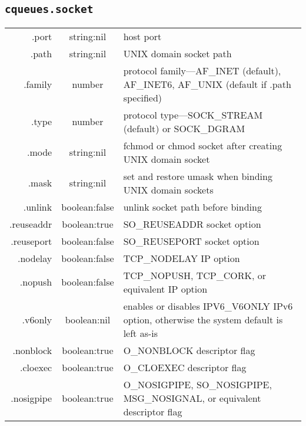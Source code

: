 \documentclass[11pt, oneside]{memoir}
\newcounter{toccols}
\newenvironment{Module}[1]{
	\subsection{\texttt{#1}}
	\addtocontents{toc}{
		\protect\begin{multicols}{\value{toccols}}
	}
}{
	\addtocontents{toc}{\protect\end{multicols}}
}
\begin{document}
\begin{Module}{cqueues.socket}
\begin{tabular}{r | c | p{4.5in}}
.port & string:nil & host port \\

.path & string:nil & UNIX domain socket path \\

.family & number & protocol family---AF\_INET (default), AF\_INET6, AF\_UNIX (default if .path specified)\\

.type & number & protocol type---SOCK\_STREAM (default) or SOCK\_DGRAM\\

.mode & string:nil & fchmod or chmod socket after creating UNIX domain socket
\\

.mask & string:nil & set and restore umask when binding UNIX domain sockets %
\\

.unlink & boolean:false & unlink socket path before binding \\

.reuseaddr & boolean:true & SO\_REUSEADDR socket option \\

.reuseport & boolean:false & SO\_REUSEPORT socket option \\

.nodelay & boolean:false & TCP\_NODELAY IP option \\

.nopush & boolean:false & TCP\_NOPUSH, TCP\_CORK, or equivalent IP option \\

.v6only & boolean:nil & enables or disables IPV6\_V6ONLY IPv6 option, otherwise the system default is left as-is \\

.nonblock & boolean:true & O\_NONBLOCK descriptor flag \\

.cloexec & boolean:true & O\_CLOEXEC descriptor flag \\

.nosigpipe & boolean:true & O\_NOSIGPIPE, SO\_NOSIGPIPE, MSG\_NOSIGNAL, or equivalent descriptor flag \\


\end{tabular}
\end{Module}
\end{document}
